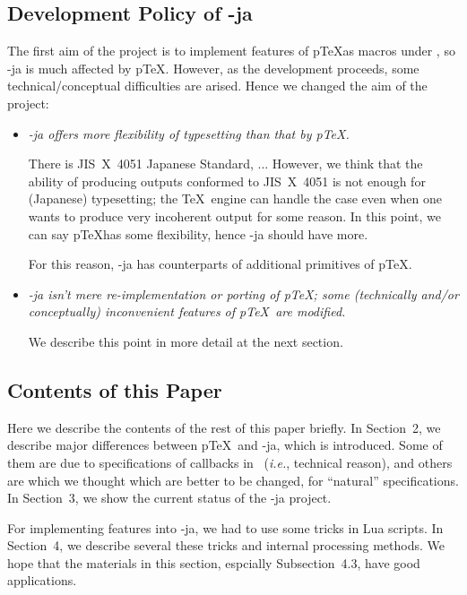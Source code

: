 \documentclass{ajt}
\begin{document}
\subsection{Development Policy of \LuaTeX-ja}
\label{ssec-pol}
The first aim of the project is to implement features of p\TeX as macros under \LuaTeX, so \LuaTeX-ja is much affected by p\TeX.
However, as the development proceeds, some technical/conceptual difficulties are arised. Hence we changed the aim of the project:
\begin{itemize}
\item\emph{\LuaTeX-ja offers more flexibility of typesetting than that by
     p\TeX.}

     There is JIS~X~4051 Japanese Standard, ...
     However, we think that the ability of producing outputs conformed to JIS~X~4051 is not enough for (Japanese) typesetting;
     the \TeX\ engine can handle the case even when one wants to produce very incoherent output for some reason.
     In this point, we can say p\TeX has some flexibility, hence \LuaTeX-ja should have more.

     For this reason, \LuaTeX-ja has counterparts of additional primitives of p\TeX.

\item\emph{\LuaTeX-ja isn't mere re-implementation or porting of p\TeX;
     some (technically and/or conceptually) inconvenient features of
     p\TeX\ are modified.} 

     We describe this point in more detail at the next section.
\end{itemize}


\subsection{Contents of this Paper}
Here we describe the contents of the rest of this paper briefly. 
In Section~2, we describe major differences between p\TeX\ and \LuaTeX-ja,
which is introduced. Some of them are due to specifications of callbacks
in \LuaTeX\ (\emph{i.e.}, technical reason), and others are which we
thought which are better to be changed, for ``natural''
specifications. In Section~3, we show the current status of the \LuaTeX-ja project.

For implementing features into \LuaTeX-ja, we had to use some tricks in Lua scripts. 
In Section~4, we describe several these tricks and internal processing methods.
We hope that the materials in this section, espcially
Subsection~4.3, have good applications.
\end{document}
